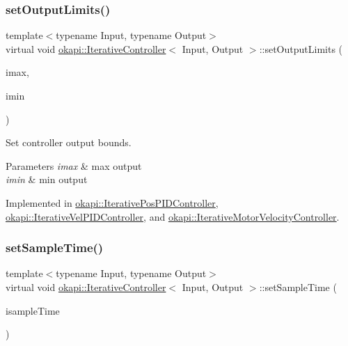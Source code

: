\subsubsection{\texorpdfstring{setOutputLimits()}{setOutputLimits()}}
{\footnotesize\ttfamily template$<$typename Input, typename Output$>$ \\
virtual void \mbox{\hyperlink{classokapi_1_1IterativeController}{okapi\+::\+Iterative\+Controller}}$<$ Input, Output $>$\+::set\+Output\+Limits (\begin{DoxyParamCaption}\item[{Output}]{imax,  }\item[{Output}]{imin }\end{DoxyParamCaption})\hspace{0.3cm}{\ttfamily [pure virtual]}}

Set controller output bounds.


\begin{DoxyParams}{Parameters}
{\em imax} & max output \\
\hline
{\em imin} & min output \\
\hline
\end{DoxyParams}


Implemented in \mbox{\hyperlink{classokapi_1_1IterativePosPIDController_a64c3fddb91ceaac4e747404afc5295ae}{okapi\+::\+Iterative\+Pos\+P\+I\+D\+Controller}}, \mbox{\hyperlink{classokapi_1_1IterativeVelPIDController_a02efd865f97b0f2da3f826c1120ec07b}{okapi\+::\+Iterative\+Vel\+P\+I\+D\+Controller}}, and \mbox{\hyperlink{classokapi_1_1IterativeMotorVelocityController_a7614e53a0847e47e5418df21670c1ddd}{okapi\+::\+Iterative\+Motor\+Velocity\+Controller}}.

\mbox{\label{classokapi_1_1IterativeController_ac4cfb1b37a3c707b2fc8f2fbda526f3e}} 
\subsubsection{\texorpdfstring{setSampleTime()}{setSampleTime()}}
{\footnotesize\ttfamily template$<$typename Input, typename Output$>$ \\
virtual void \mbox{\hyperlink{classokapi_1_1IterativeController}{okapi\+::\+Iterative\+Controller}}$<$ Input, Output $>$\+::set\+Sample\+Time (\begin{DoxyParamCaption}\item[{Q\+Time}]{isample\+Time }\end{DoxyParamCaption})\hspace{0.3cm}{\ttfamily [pure virtual]}}

